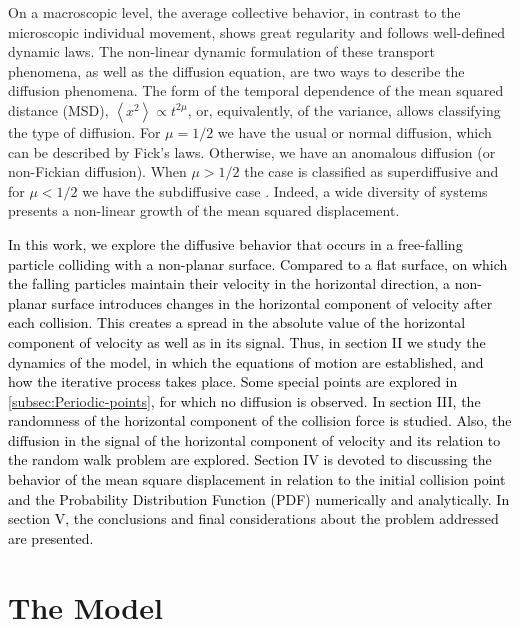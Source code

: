 \documentclass[reprint, aps, pre,nofootinbib]{revtex4-1}
\begin{document}
On a macroscopic level, the average collective behavior, in contrast
to the microscopic individual movement, shows great regularity and
follows well-defined dynamic laws. The non-linear dynamic formulation
of these transport phenomena, as well as the diffusion equation, are
two ways to describe the diffusion phenomena. The form of the temporal
dependence of the mean squared distance (MSD), $\left\langle x^{2}\right\rangle \propto t^{2\mu}$,
or, equivalently, of the variance, allows classifying the type of
diffusion. For $\mu=1/2$ we have the usual or normal diffusion, which
can be described by Fick's laws. Otherwise, we have an anomalous diffusion
(or non-Fickian diffusion). When $\mu>1/2$ the case is classified
as superdiffusive \citep{Geisel,Szymanski} and for $\mu<1/2$ we
have the subdiffusive case \citep{Saxton2001,Massignan2014}. Indeed,
a wide diversity of systems presents a non-linear growth of the mean
squared displacement.

\textcolor{black}{In this work, we explore the diffusive behavior
that occurs in a free-falling particle colliding with a non-planar
surface. Compared to a flat surface, on which the falling particles
maintain their velocity in the horizontal direction, a non-planar
surface introduces changes in the horizontal component of velocity
after each collision. This creates a spread in the absolute value
of the horizontal component of velocity as well as in its signal.
Thus, in section II we study the dynamics of the model, in which the
equations of motion are established, and how the iterative process
takes place. Some special points are explored in \ref{subsec:Periodic-points},
for which no diffusion is observed. In section III, the randomness
of the horizontal component of the collision force is studied. Also,
the diffusion in the signal of the horizontal component of velocity
and its relation to the random walk problem are explored. Section
IV is devoted to discussing the behavior of the mean square displacement
in relation to the initial collision point and the Probability Distribution
Function (PDF) numerically and analytically. In section V, the conclusions
and final considerations about the problem addressed are presented.}

\section{The Model}
\end{document}
